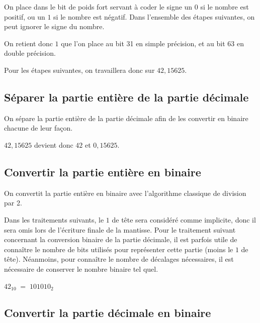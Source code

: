 \documentclass[11pt,a4paper]{article}
\begin{document}
\medskip

On place dans le bit de poids fort servant à coder le signe un $ 0 $ si le nombre est positif, ou un $ 1 $ si le nombre est négatif.
Dans l'ensemble des étapes suivantes, on peut ignorer le signe du nombre.

\medskip

On retient donc $ 1 $ que l'on place au bit 31 en simple précision, et au bit 63 en double précision.

Pour les étapes suivantes, on travaillera donc sur $ 42,15625 $.

\bigskip

\subsection{Séparer la partie entière de la partie décimale}

\medskip

On sépare la partie entière de la partie décimale afin de les convertir en binaire chacune de leur façon.

\medskip

$ 42,15625 $ devient donc $ 42 $ et $ 0,15625 $.

\bigskip

\subsection{Convertir la partie entière en binaire}

\medskip

On convertit la partie entière en binaire avec l'algorithme classique de division par 2.

\medskip

Dans les traitements suivants, le $ 1 $ de tête sera considéré comme implicite, donc il sera omis lors de l'écriture finale de la mantisse.
Pour le traitement suivant concernant la conversion binaire de la partie décimale, il est parfois utile de connaître le nombre de bits utilisés pour représenter cette partie (moins le $ 1 $ de tête).
Néanmoins, pour connaître le nombre de décalages nécessaires, il est nécessaire de conserver le nombre binaire tel quel.

\medskip

$ 42_{10} \; = \; 101010_{2} $

\bigskip

\subsection{Convertir la partie décimale en binaire}
\end{document}
